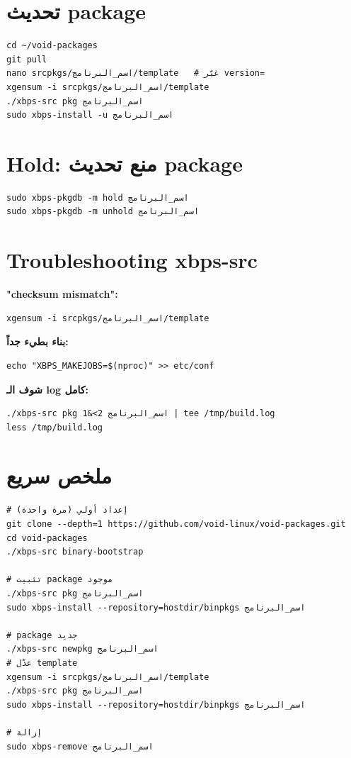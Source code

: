 \documentclass[12pt, a4paper]{report}
\begin{document}
\section{تحديث package}
\begin{lstlisting}
cd ~/void-packages
git pull
nano srcpkgs/اسم_البرنامج/template   # غيّر version=
xgensum -i srcpkgs/اسم_البرنامج/template
./xbps-src pkg اسم_البرنامج
sudo xbps-install -u اسم_البرنامج
\end{lstlisting}

\section{Hold: منع تحديث package}
\begin{lstlisting}
sudo xbps-pkgdb -m hold اسم_البرنامج
sudo xbps-pkgdb -m unhold اسم_البرنامج
\end{lstlisting}

\section{Troubleshooting xbps-src}

\textbf{"checksum mismatch":}
\begin{lstlisting}
xgensum -i srcpkgs/اسم_البرنامج/template
\end{lstlisting}

\textbf{بناء بطيء جداً:}
\begin{lstlisting}
echo "XBPS_MAKEJOBS=$(nproc)" >> etc/conf
\end{lstlisting}

\textbf{شوف الـ log كامل:}
\begin{lstlisting}
./xbps-src pkg اسم_البرنامج 2>&1 | tee /tmp/build.log
less /tmp/build.log
\end{lstlisting}

\section{ملخص سريع}
\begin{lstlisting}
# إعداد أولي (مرة واحدة)
git clone --depth=1 https://github.com/void-linux/void-packages.git
cd void-packages
./xbps-src binary-bootstrap

# تثبيت package موجود
./xbps-src pkg اسم_البرنامج
sudo xbps-install --repository=hostdir/binpkgs اسم_البرنامج

# package جديد
./xbps-src newpkg اسم_البرنامج
# عدّل template
xgensum -i srcpkgs/اسم_البرنامج/template
./xbps-src pkg اسم_البرنامج
sudo xbps-install --repository=hostdir/binpkgs اسم_البرنامج

# إزالة
sudo xbps-remove اسم_البرنامج
\end{lstlisting}

\end{document}
